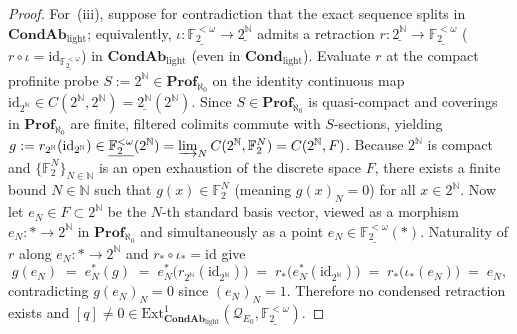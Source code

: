 \begin{proof}
For~(iii), suppose for contradiction that the exact sequence splits in $\mathbf{CondAb}_{\mathrm{light}}$; equivalently, $\iota : \underline{\mathbb{F}_2^{<\omega}} \to \underline{2^{\mathbb{N}}}$ admits a retraction $r : \underline{2^{\mathbb{N}}} \to \underline{\mathbb{F}_2^{<\omega}}$ ($r \circ \iota = \mathrm{id}_{\underline{\mathbb{F}_2^{<\omega}}}$) in $\mathbf{CondAb}_{\mathrm{light}}$ (even in $\mathbf{Cond}_{\mathrm{light}}$). Evaluate $r$ at the compact profinite probe $S := 2^{\mathbb{N}} \in \mathbf{Prof}_{\aleph_0}$ on the identity continuous map $\mathrm{id}_{2^{\mathbb{N}}} \in C(2^{\mathbb{N}}, 2^{\mathbb{N}}) = \underline{2^{\mathbb{N}}}(2^{\mathbb{N}})$. Since $S \in \mathbf{Prof}_{\aleph_0}$ is quasi-compact and coverings in $\mathbf{Prof}_{\aleph_0}$ are finite, filtered colimits commute with $S$-sections, yielding $g := r_{2^{\mathbb{N}}}(\mathrm{id}_{2^{\mathbb{N}}}) \in \underline{\mathbb{F}_2^{<\omega}}(2^{\mathbb{N}}) = \varinjlim_N C(2^{\mathbb{N}}, \mathbb{F}_2^N) = C(2^{\mathbb{N}}, F)$. Because $2^{\mathbb{N}}$ is compact and $\{\mathbb{F}_2^N\}_{N \in \mathbb{N}}$ is an open exhaustion of the discrete space $F$, there exists a finite bound $N \in \mathbb{N}$ such that $g(x) \in \mathbb{F}_2^N$ (meaning $g(x)_N = 0$) for all $x \in 2^{\mathbb{N}}$. Now let $e_N \in F \subset 2^{\mathbb{N}}$ be the $N$-th standard basis vector, viewed as a morphism $e_N : * \to 2^{\mathbb{N}}$ in $\mathbf{Prof}_{\aleph_0}$ and simultaneously as a point $e_N \in \underline{\mathbb{F}_2^{<\omega}}(*)$. Naturality of $r$ along $e_N : * \to 2^{\mathbb{N}}$ and $r_* \circ \iota_* = \mathrm{id}$ give
\[
  g(e_N) \;=\; e_N^*(g) \;=\; e_N^*\bigl(r_{2^{\mathbb{N}}}(\mathrm{id}_{2^{\mathbb{N}}})\bigr) \;=\; r_*\bigl(e_N^*(\mathrm{id}_{2^{\mathbb{N}}})\bigr) \;=\; r_*\bigl(\iota_*(e_N)\bigr) \;=\; e_N,
\]
contradicting $g(e_N)_N = 0$ since $(e_N)_N = 1$. Therefore no condensed retraction exists and $[q] \neq 0 \in \mathrm{Ext}^1_{\mathbf{CondAb}_{\mathrm{light}}}(\mathcal{Q}_{E_0}, \underline{\mathbb{F}_2^{<\omega}})$.
\end{proof}

